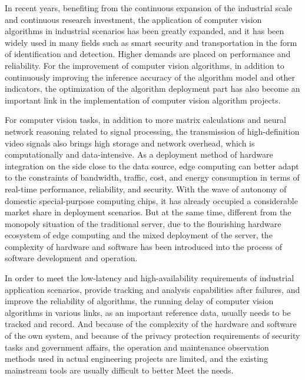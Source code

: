 \documentclass[master]{shtthesis}
\begin{document}
\begin{abstract*}[flattitle]
In recent years, benefiting from the continuous expansion of the industrial scale and continuous research investment, the application of computer vision algorithms in industrial scenarios has been greatly expanded, and it has been widely used in many fields such as smart security and transportation in the form of identification and detection. Higher demands are placed on performance and reliability. For the improvement of computer vision algorithms, in addition to continuously improving the inference accuracy of the algorithm model and other indicators, the optimization of the algorithm deployment part has also become an important link in the implementation of computer vision algorithm projects.

For computer vision tasks, in addition to more matrix calculations and neural network reasoning related to signal processing, the transmission of high-definition video signals also brings high storage and network overhead, which is computationally and data-intensive. As a deployment method of hardware integration on the side close to the data source, edge computing can better adapt to the constraints of bandwidth, traffic, cost, and energy consumption in terms of real-time performance, reliability, and security. With the wave of autonomy of domestic special-purpose computing chips, it has already occupied a considerable market share in deployment scenarios. But at the same time, different from the monopoly situation of the traditional server, due to the flourishing hardware ecosystem of edge computing and the mixed deployment of the server, the complexity of hardware and software has been introduced into the process of software development and operation.

In order to meet the low-latency and high-availability requirements of industrial application scenarios, provide tracking and analysis capabilities after failures, and improve the reliability of algorithms, the running delay of computer vision algorithms in various links, as an important reference data, usually needs to be tracked and record. And because of the complexity of the hardware and software of the own system, and because of the privacy protection requirements of security tasks and government affairs, the operation and maintenance observation methods used in actual engineering projects are limited, and the existing mainstream tools are usually difficult to better Meet the needs.


\end{abstract*}
\end{document}
